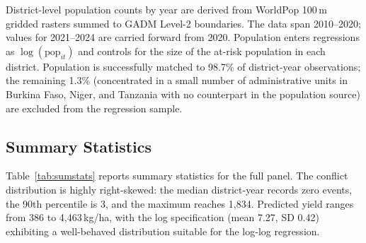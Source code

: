 District-level population counts by year are derived from WorldPop 100\,m gridded rasters summed to GADM Level-2 boundaries. The data span 2010--2020; values for 2021--2024 are carried forward from 2020. Population enters regressions as $\log(\text{pop}_{it})$ and controls for the size of the at-risk population in each district. Population is successfully matched to 98.7\% of district-year observations; the remaining 1.3\% (concentrated in a small number of administrative units in Burkina Faso, Niger, and Tanzania with no counterpart in the population source) are excluded from the regression sample.

\subsection{Summary Statistics}

Table~\ref{tab:sumstats} reports summary statistics for the full panel. The conflict distribution is highly right-skewed: the median district-year records zero events, the 90th percentile is 3, and the maximum reaches 1,834. Predicted yield ranges from 386 to 4,463\,kg/ha, with the log specification (mean 7.27, SD 0.42) exhibiting a well-behaved distribution suitable for the log-log regression.

